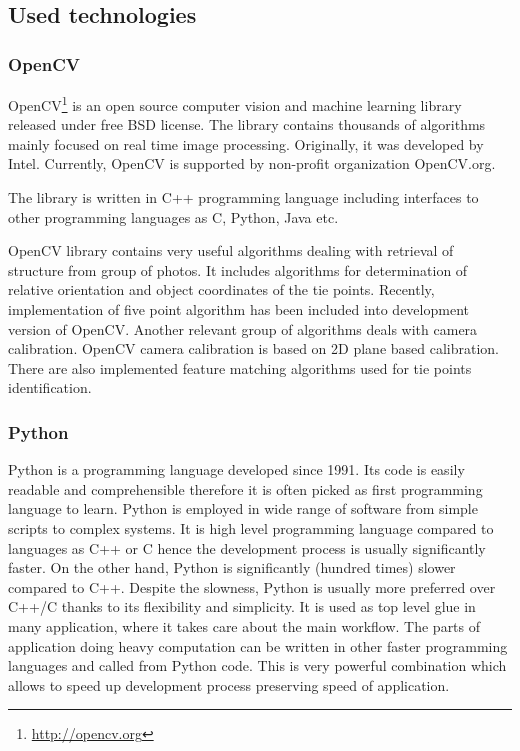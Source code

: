 \documentclass[a4paper,12pt]{article}
\begin{document}
\subsection{Used technologies}

\subsubsection{OpenCV}

OpenCV\footnote{\url{http://opencv.org}} is an open source computer vision and machine learning library released under free BSD license.
The library contains thousands of algorithms mainly focused on real time image processing.
Originally, it was developed by Intel. Currently, OpenCV is supported by non-profit organization OpenCV.org.

The library is written in C++ programming language including interfaces to other programming languages as C, Python, Java etc. 

OpenCV library contains very useful algorithms dealing with retrieval of structure from group 
of photos. It includes algorithms for determination of relative orientation 
and object coordinates of the tie points.
Recently, implementation of five point algorithm has been included into development version of OpenCV.
Another relevant group of algorithms deals with camera calibration. OpenCV  camera calibration
is based on 2D plane based calibration.  
There are also implemented feature matching algorithms used for tie points identification. 

\subsubsection{Python}

Python is a programming language developed since 1991. 
Its code is easily readable and comprehensible therefore it is often picked as first programming
language to learn. Python is employed in wide range of software from simple scripts to complex systems.
It is high level programming language compared to languages as C++ or C hence 
the development process is usually significantly faster. On the other hand,
Python is significantly (hundred times) slower compared to C++. Despite the slowness, 
 Python is usually more preferred over C++/C thanks to its flexibility and simplicity.
It is used as top level glue in many application, where it takes care about 
the main workflow. The parts of application doing heavy computation can 
be written in other faster programming languages and called 
from Python code. This is very powerful combination which allows to speed up development 
process preserving speed of application.
\end{document}
